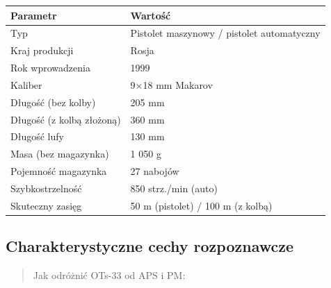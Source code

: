 \documentclass[12pt,oneside]{book}
\begin{document}
\begin{longtable}[]{@{}ll@{}}
\toprule\noalign{}
Parametr & Wartość \\
\midrule\noalign{}
\endhead
\bottomrule\noalign{}
\endlastfoot
Typ & Pistolet maszynowy / pistolet automatyczny \\
Kraj produkcji & Rosja \\
Rok wprowadzenia & 1999 \\
Kaliber & 9×18 mm Makarov \\
Długość (bez kolby) & 205 mm \\
Długość (z kolbą złożoną) & 360 mm \\
Długość lufy & 130 mm \\
Masa (bez magazynka) & 1 050 g \\
Pojemność magazynka & 27 nabojów \\
Szybkostrzelność & 850 strz./min (auto) \\
Skuteczny zasięg & 50 m (pistolet) / 100 m (z kolbą) \\
\end{longtable}

\subsection{Charakterystyczne cechy
rozpoznawcze}\label{charakterystyczne-cechy-rozpoznawcze-109}

\begin{quote}
Jak odróżnić OTs-33 od APS i PM:
\end{quote}
\end{document}

